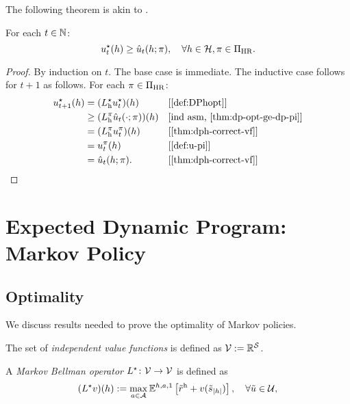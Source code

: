 The following theorem is akin to \citep[theorem~4.3.2]{Puterman2005}.
\begin{theorem}\label{thm:dph-opt-vf-opt}
For each $t\in \mathbb{N}$:
  \[
    u^{\star}_t(h)
    \ge 
    \hat{u}_t(h; \pi), \quad \forall h\in \mathcal{H}, \pi\in \Pi_{\mathrm{HR}}.
  \]
\end{theorem}
\begin{proof}
  By induction on $t$. The base case is immediate. The inductive case follows for $t+1$ as follows. For each $\pi\in \Pi_{\mathrm{HR}}$:
  \begin{align*}
    u_{t+1}\opt(h)
    &= (L_{\mathrm{h}}\opt u_t\opt)(h) && \why{\cref{def:DPhopt}} \\
    &\ge (L_{\mathrm{h}}^{\pi} \hat{u}_t(\cdot; \pi))(h) && \why{ind asm, \cref{thm:dp-opt-ge-dp-pi}} \\
    &= (L_{\mathrm{h}}^{\pi} u_t^{\pi})(h) && \why{\cref{thm:dph-correct-vf}} \\
    &= u_t^{\pi}(h) && \why{\cref{def:u-pi}} \\
    &= \hat{u}_t(h; \pi). && \why{\cref{thm:dph-correct-vf}} \\
  \end{align*}
\end{proof}

\section{Expected Dynamic Program: Markov Policy}

\subsection{Optimality}
We discuss results needed to prove the optimality of Markov policies. 

\begin{definition} \label{def:Values}
  The set of \emph{independent value functions} is defined as $\mathcal{V} := \mathbb{R}^{\mathcal{S}}$.
  \leanok
\end{definition}

\begin{definition}\label{def:DPMopt}
A \emph{Markov Bellman operator} $L^{\star}\colon \mathcal{V} \to \mathcal{V}$ is defined as
\[
(L^{\star}  v)(h)  :=
\max_{a\in \mathcal{A}} \mathbb{E}^{h, a, 1} \left[ \tilde{r}^{\mathrm{h}} + v(\tilde{s}_{|h|}) \right], \quad \forall \tilde{u} \in \mathcal{U},
\]
\leanok
\end{definition}

